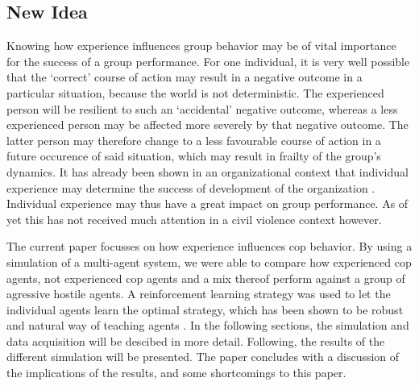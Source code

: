 \subsection{New Idea}
Knowing how experience influences group behavior may be of vital importance for the success of a group performance. For one individual, it is very well possible that the `correct' course of action may result in a negative outcome in a particular situation, because the world is not deterministic. The experienced person will be resilient to such an `accidental' negative outcome, whereas a less experienced person may be affected more severely by that negative outcome. The latter person may therefore change to a less favourable course of action in a future occurence of said situation, which may result in frailty of the group's dynamics. It has already been shown in an organizational context that individual experience may determine the success of development of the organization \citep*{reagans2005individual}. Individual experience may thus have a great impact on group performance. As of yet this has not received much attention in a civil violence context however. 

The current paper focusses on how experience influences cop behavior. By using a simulation of a multi-agent system, we were able to compare how experienced cop agents, not experienced cop agents and a mix thereof perform against a group of agressive hostile agents. A reinforcement learning strategy was used to let the individual agents learn the optimal strategy, which has been shown to be robust and natural way of teaching agents \citep{claus1998dynamics}. In the following sections, the simulation and data acquisition will be descibed in more detail. Following, the results of the different simulation will be presented. The paper concludes with a discussion of the implications of the results, and some shortcomings to this paper. 